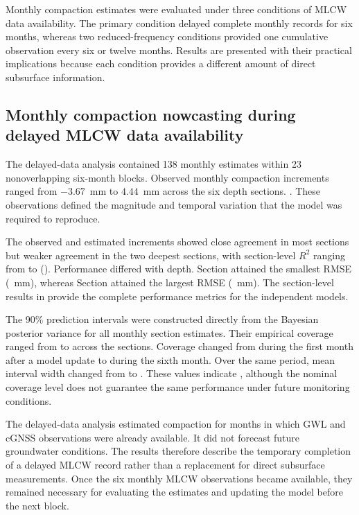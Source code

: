 Monthly compaction estimates were evaluated under three conditions of MLCW data availability. The primary condition delayed complete monthly records for six months, whereas two reduced-frequency conditions provided one cumulative observation every six or twelve months. Results are presented with their practical implications because each condition provides a different amount of direct subsurface information.

\subsection{Monthly compaction nowcasting during delayed MLCW data availability}
\label{subsec:results_delayed_nowcast}

The delayed-data analysis contained 138 monthly estimates within 23 nonoverlapping six-month blocks. Observed monthly compaction increments ranged from $-3.67$~mm to $4.44$~mm across the six depth sections. . These observations defined the magnitude and temporal variation that the model was required to reproduce.

The observed and estimated increments showed close agreement in most sections but weaker agreement in the two deepest sections, with section-level $R^2$ ranging from  to  (). Performance differed with depth. Section  attained the smallest RMSE (~mm), whereas Section  attained the largest RMSE (~mm). The section-level results in  provide the complete performance metrics for the independent models.

The 90\% prediction intervals were constructed directly from the Bayesian posterior variance for all monthly section estimates. Their empirical coverage ranged from  to  across the sections. Coverage changed from  during the first month after a model update to  during the sixth month. Over the same period, mean interval width changed from  to . These values indicate , although the nominal coverage level does not guarantee the same performance under future monitoring conditions.

The delayed-data analysis estimated compaction for months in which GWL and cGNSS observations were already available. It did not forecast future groundwater conditions. The results therefore describe the temporary completion of a delayed MLCW record rather than a replacement for direct subsurface measurements. Once the six monthly MLCW observations became available, they remained necessary for evaluating the estimates and updating the model before the next block.

